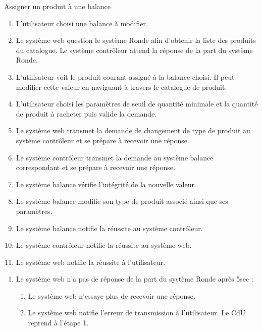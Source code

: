 \begin{UseCase}{Assigner un produit à une balance}
    \begin{UseCaseScenario}
        \begin{enumerate}
            \item L'utilisateur choisi une balance à modifier.
            \item Le système web question le système Ronde afin d'obtenir la
                liste des produits du catalogue. Le système contrôleur attend
                la réponse de la part du système Ronde.
            \item L'utilisateur voit le produit courant assigné à la balance
                choisi. Il peut modifier cette valeur en naviguant à travers le
                catalogue de produit.
            \item L'utilisateur choisi les paramètres de seuil de quantité
                minimale et la quantité de produit à racheter puis valide la
                demande.
            \item Le système web transmet la demande de changement de type de
                produit au système contrôleur et se prépare à recevoir une
                réponse.
            \item Le système contrôleur transmet la demande au système balance
                correspondant et se prépare à recevoir une réponse.
            \item Le système balance vérifie l'intégrité de la nouvelle valeur.
            \item Le système balance modifie son type de produit associé ainsi
                que ses paramètres.
            \item Le système balance notifie la réussite au système contrôleur.
            \item Le système contrôleur notifie la réussite au système web.
            \item Le système web notifie la réussite à l'utilisateur.
        \end{enumerate}
    \end{UseCaseScenario}

    \begin{UseCaseExtension}
        \begin{enumerate}
        \item[2.a] Le système web n'a pas de réponse de la part du système Ronde
            après 5sec :
            \begin{enumerate}
                \item Le système web n'essaye plus de recevoir une réponse.
                \item Le système web notifie l'erreur de transmission à
                    l'utilisateur. Le CdU reprend à l'étape 1.
            \end{enumerate}


\end{enumerate}
\end{UseCaseExtension}
\end{UseCase}
